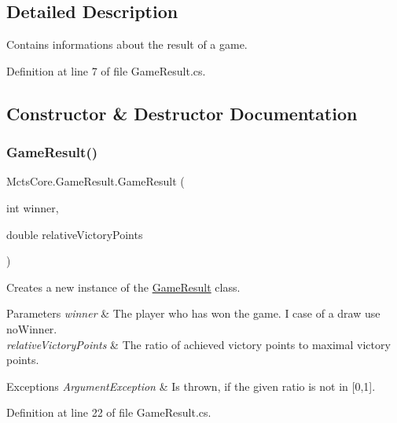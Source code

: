 \subsection{Detailed Description}
Contains informations about the result of a game. 



Definition at line 7 of file Game\+Result.\+cs.



\subsection{Constructor \& Destructor Documentation}
\mbox{\label{class_mcts_core_1_1_game_result_a8c9838394b760c3e23498f1033be9727}} 
\subsubsection{\texorpdfstring{Game\+Result()}{GameResult()}}
{\footnotesize\ttfamily Mcts\+Core.\+Game\+Result.\+Game\+Result (\begin{DoxyParamCaption}\item[{int}]{winner,  }\item[{double}]{relative\+Victory\+Points }\end{DoxyParamCaption})}



Creates a new instance of the \mbox{\hyperlink{class_mcts_core_1_1_game_result}{Game\+Result}} class. 


\begin{DoxyParams}{Parameters}
{\em winner} & The player who has won the game. I case of a draw use no\+Winner.\\
\hline
{\em relative\+Victory\+Points} & The ratio of achieved victory points to maximal victory points.\\
\hline
\end{DoxyParams}

\begin{DoxyExceptions}{Exceptions}
{\em Argument\+Exception} & Is thrown, if the given ratio is not in \mbox{[}0,1\mbox{]}.\\
\hline
\end{DoxyExceptions}


Definition at line 22 of file Game\+Result.\+cs.



